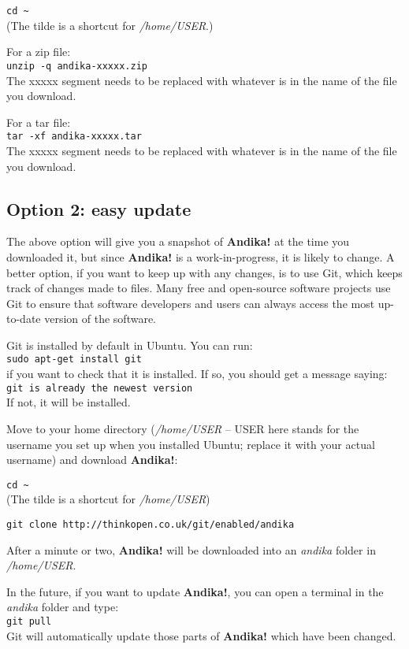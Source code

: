 \documentclass[a4paper,10pt]{article}
\begin{document}
\verb|cd ~|\\
(The tilde is a shortcut for \textit{/home/USER}.)

For a zip file:\\
\verb|unzip -q andika-xxxxx.zip|\\
The xxxxx segment needs to be replaced with whatever is in the name of the file you download.

For a tar file:\\
\verb|tar -xf andika-xxxxx.tar|\\
The xxxxx segment needs to be replaced with whatever is in the name of the file you download.

\subsection{Option 2: easy update}

The above option will give you a snapshot of \textbf{Andika!} at the time you downloaded it, but since \textbf{Andika!} is a work-in-progress, it is likely to change.  A better option, if you want to keep up with any changes, is to use Git, which keeps track of changes made to files.  Many free and open-source software projects use Git to ensure that software developers and users can always access the most up-to-date version of the software.

Git is installed by default in Ubuntu.  You can run:\\
\verb|sudo apt-get install git|\\
if you want to check that it is installed.  If so, you should get a message saying:\\
\verb|git is already the newest version|\\
If not, it will be installed.

Move to your home directory (\textit{/home/USER} -- USER here stands for the username you set up when you installed Ubuntu; replace it with your actual username) and download \textbf{Andika!}:

\verb|cd ~|\\
(The tilde is a shortcut for \textit{/home/USER})

\verb|git clone http://thinkopen.co.uk/git/enabled/andika|

After a minute or two, \textbf{Andika!} will be downloaded into an \textit{andika} folder in \textit{/home/USER}.

In the future, if you want to update \textbf{Andika!}, you can open a terminal in the \textit{andika} folder and type:\\
\verb|git pull|\\
Git will automatically update those parts of \textbf{Andika!} which have been changed.
\end{document}
